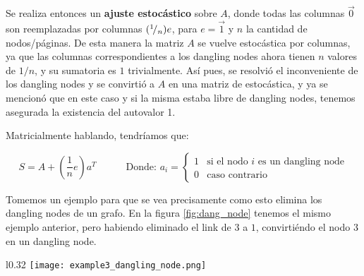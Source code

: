 \par Se realiza entonces un \textbf{ajuste estoc\'astico} sobre $A$, donde todas
las columnas $\overrightarrow{0}$ son reemplazadas por columnas
$({}^{1}\!/_{n})e$, para $e = \overrightarrow{1}$ y $n$ la cantidad de
nodos/p\'aginas. De esta manera la matriz $A$ se vuelve estoc\'astica por
columnas, ya que las columnas correspondientes a los dangling
nodes ahora tienen $n$ valores de $1/n$, y su sumatoria es $1$ trivialmente.
As\'i pues, se resolvi\'o el inconveniente de los dangling nodes y se
convirti\'o a $A$ en una matriz de estoc\'astica, y ya se mencion\'o que en este
caso y si la misma estaba libre de dangling nodes, tenemos asegurada la
existencia del autovalor 1.

\par Matricialmente hablando, tendr\'iamos que:

\begin{equation}
    S = A + \left(\dfrac{1}{n}e\right)a^T \quad\quad\quad
        \text{Donde: } a_i =
        \begin{cases}
            1 &\text{si el nodo $i$ es un dangling node}\\
            0 &\text{caso contrario}
        \end{cases}
\end{equation}
\medskip

\par Tomemos un ejemplo para que se vea precisamente como esto elimina los
dangling nodes de un grafo. En la figura \ref{fig:dang_node} tenemos el mismo
ejemplo anterior, pero habiendo eliminado el link de $3$ a $1$, convirti\'endo
el nodo $3$ en un dangling node.

\newpage
\begin{wrapfigure}[8]{l}{0.32\textwidth}
    \texttt{[image: example3\_dangling\_node.png]}
    \caption{Dangling Nodes}
    \label{fig:dang_node}
\end{wrapfigure}
\noindent

